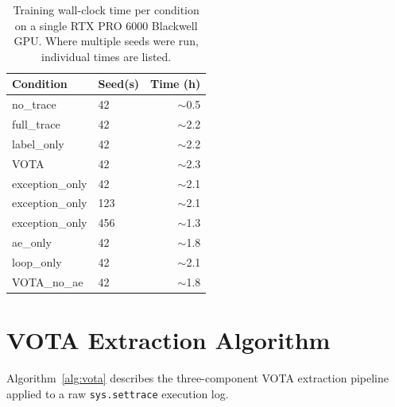 \begin{table}[t]
\centering
\caption{Training wall-clock time per condition on a single RTX PRO 6000 Blackwell GPU. Where multiple seeds were run, individual times are listed.}
\label{tab:train_time}
\small
\begin{tabular}{llr}
\toprule
\textbf{Condition} & \textbf{Seed(s)} & \textbf{Time (h)} \\
\midrule
no\_trace       & 42         & ${\sim}$0.5 \\
full\_trace     & 42         & ${\sim}$2.2 \\
label\_only     & 42         & ${\sim}$2.2 \\
VOTA                     & 42         & ${\sim}$2.3 \\
exception\_only & 42         & ${\sim}$2.1 \\
exception\_only & 123        & ${\sim}$2.1 \\
exception\_only & 456        & ${\sim}$1.3 \\
ae\_only        & 42         & ${\sim}$1.8 \\
loop\_only      & 42         & ${\sim}$2.1 \\
VOTA\_no\_ae    & 42         & ${\sim}$1.8 \\
\bottomrule
\end{tabular}
\end{table}

\section{VOTA Extraction Algorithm}
\label{sec:vota_algorithm}

Algorithm~\ref{alg:vota} describes the three-component VOTA extraction pipeline applied to a raw \texttt{sys.settrace} execution log.


